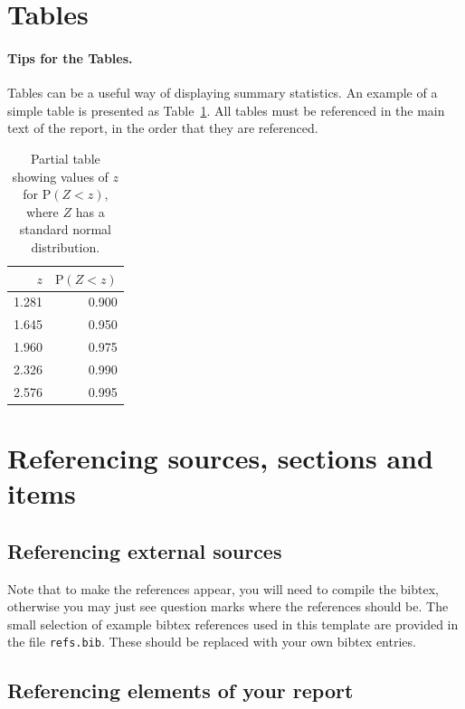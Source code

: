 \section{Tables}\label{sec:tablesection}

\paragraph{Tips for the Tables.} Tables can be a useful way of displaying summary statistics. An example of a simple table is presented as Table~\ref{tab:normal}. All tables must be referenced in the main text of the report, in the order that they are referenced.

\begin{table}[ht]
\centering
\begin{tabular}{rr}
  \hline
    $z$& $\textrm{P}(Z < z)$ \\
  \hline
    1.281& 0.900\\
    1.645& 0.950\\
    1.960& 0.975\\
    2.326& 0.990 \\
    2.576& 0.995 \\
   \hline
\end{tabular}
    \caption{Partial table showing values of $z$ for $\textrm{P}(Z < z)$, 
    where $Z$ has a standard normal distribution.}
    \label{tab:normal}
\end{table}



\section{Referencing sources, sections and items} \label{sec:referencing}

\subsection{Referencing external sources}


Note that to make the references appear, you will need to compile the bibtex, otherwise you may just see question marks where the references should be. The small selection of example bibtex references used in this template are provided in the file \texttt{refs.bib}. These should be replaced with your own bibtex entries.
 
\subsection{Referencing elements of your report}

